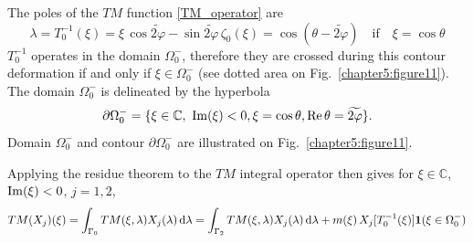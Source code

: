 The poles of the $TM$ function \eqref{TM_operator} are
$$ \lambda = T_0^{-1}(\xi) = \xi \, \cos \widetilde{2\varphi}  - \sin \widetilde{2\varphi} \, \zeta_0(\xi) = \cos (\theta - \widetilde{2\varphi}) \quad \text{if} \quad \xi = \cos \theta $$
$T_0^{-1}$ operates in the domain $\Omega_0^-$, therefore they are crossed during this contour deformation if and only if $\xi \in \Omega_0^-$ (see dotted area on Fig.~\ref{chapter5:figure11}).
The domain $\Omega_0^-$ is delineated by the hyperbola 
\begin{equation}
\partial \Omega_0^- = \{   \xi \in \mathbb{C}, \ {\rm Im}(\xi) <0,  \xi = \cos \theta, {\rm Re} \, \theta = \widetilde{2\varphi} \}.
\end{equation}
Domain $\Omega_0^-$ and contour $\partial \Omega_0^-$ are illustrated on Fig.~\ref{chapter5:figure11}.   

Applying the residue theorem to the $TM$ integral operator then gives for $\xi \in \mathbb{C}$, ${\rm Im}(\xi) <0$, $j=1,2$,
\begin{equation}
\label{TM_propag_sol}
TM(X_j)(\xi) = \int_{\Gamma_0} TM(\xi,\lambda) X_j(\lambda) \, {\rm d} \lambda  = \int_{\Gamma_2} TM(\xi,\lambda) X_j(\lambda) \, {\rm d} \lambda + m(\xi) \, X_j[T_0^{-1}(\xi)] \mathbf{1}(\xi \in \Omega_0^-)
\end{equation}

